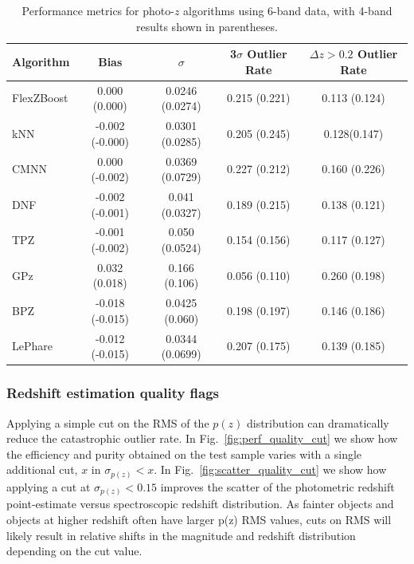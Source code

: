 \begin{table}[ht]
\centering
\caption{Performance metrics for photo-$z$ algorithms using 6-band data, with 4-band results shown in parentheses.}
\begin{tabular}{lcccc}
\hline
\textbf{Algorithm} & \textbf{Bias} & \textbf{$\sigma$} & \textbf{3$\sigma$ Outlier Rate} & \textbf{$\Delta z>0.2$ Outlier Rate} \\
\hline
FlexZBoost & 0.000 (0.000) & 0.0246 (0.0274) & 0.215 (0.221) & 0.113 (0.124) \\
kNN        & -0.002 (-0.000) & 0.0301 (0.0285) & 0.205 (0.245) & 0.128(0.147) \\
CMNN       & 0.000 (-0.002) & 0.0369 (0.0729) & 0.227 (0.212) & 0.160 (0.226) \\
DNF        & -0.002 (-0.001) & 0.041 (0.0327) & 0.189 (0.215) & 0.138 (0.121) \\
TPZ        & -0.001 (-0.002) & 0.050 (0.0524) & 0.154 (0.156) & 0.117 (0.127) \\
GPz        & 0.032 (0.018) & 0.166 (0.106) & 0.056 (0.110) & 0.260 (0.198) \\
BPZ        & -0.018 (-0.015) & 0.0425 (0.060) & 0.198 (0.197) & 0.146 (0.186) \\
LePhare    & -0.012 (-0.015) & 0.0344 (0.0699) & 0.207 (0.175) & 0.139 (0.185) \\
\hline
\end{tabular}
\label{tab:photoz_metrics}
\end{table}



\subsubsection{Redshift estimation quality flags}
\label{sec:performance:pz:flags}

Applying a simple cut on the RMS of the $p(z)$ distribution can dramatically reduce the catastrophic outlier rate.  In Fig.~\ref{fig:perf_quality_cut} we show how the efficiency and purity obtained on the test sample varies with a single additional cut, $x$ in $\sigma_{p(z)} < x$.   In Fig.~\ref{fig:scatter_quality_cut} we show how applying a cut at $\sigma_{p(z)} < 0.15$ improves the scatter of the photometric redshift point-estimate versus spectroscopic redshift distribution.  As fainter objects and objects at higher redshift often have larger p(z) RMS values, cuts on RMS will likely result in relative shifts in the magnitude and redshift distribution depending on the cut value.

